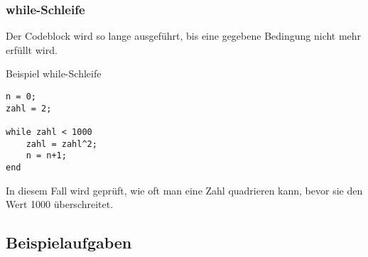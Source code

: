         \subsubsection*{while-Schleife}
        Der Codeblock wird so lange ausgeführt, bis eine gegebene Bedingung nicht mehr erfüllt wird.
        \begin{Codelösung}{Beispiel while-Schleife}
                \begin{lstlisting}
n = 0;
zahl = 2;

while zahl < 1000
    zahl = zahl^2;
    n = n+1;
end
                \end{lstlisting}
        \end{Codelösung}
        \noindent In diesem Fall wird geprüft, wie oft man eine Zahl quadrieren kann, bevor sie den Wert 1000 überschreitet.
        \subsection{Beispielaufgaben}